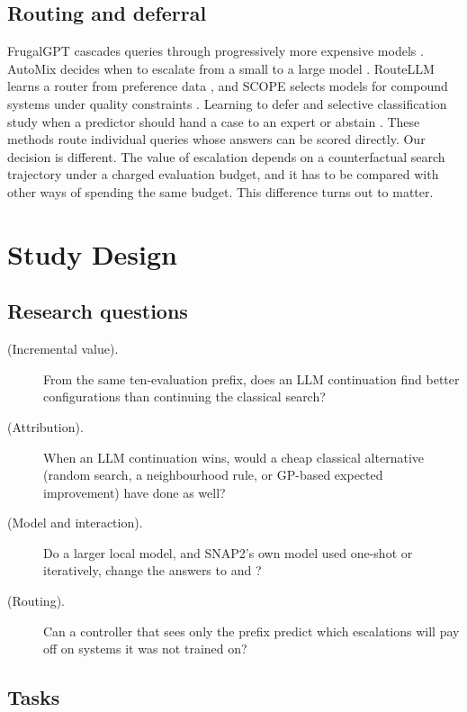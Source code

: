 \subsection{Routing and deferral}

FrugalGPT cascades queries through progressively more expensive models \cite{chen2023frugalgpt}. AutoMix decides when to escalate from a small to a large model \cite{aggarwal2023automix}. RouteLLM learns a router from preference data \cite{ong2024routellm}, and SCOPE selects models for compound systems under quality constraints \cite{huang2026scope}. Learning to defer and selective classification study when a predictor should hand a case to an expert or abstain \cite{mozannar2020defer,geifman2017selective}. These methods route individual queries whose answers can be scored directly. Our decision is different. The value of escalation depends on a counterfactual search trajectory under a charged evaluation budget, and it has to be compared with other ways of spending the same budget. This difference turns out to matter.

\section{Study Design}

\subsection{Research questions}

\begin{description}
  \item[ (Incremental value).] From the same ten-evaluation prefix, does an LLM continuation find better configurations than continuing the classical search?
  \item[ (Attribution).] When an LLM continuation wins, would a cheap classical alternative (random search, a neighbourhood rule, or GP-based expected improvement) have done as well?
  \item[ (Model and interaction).] Do a larger local model, and SNAP2's own model used one-shot or iteratively, change the answers to  and ?
  \item[ (Routing).] Can a controller that sees only the prefix predict which escalations will pay off on systems it was not trained on?
\end{description}

\subsection{Tasks}

